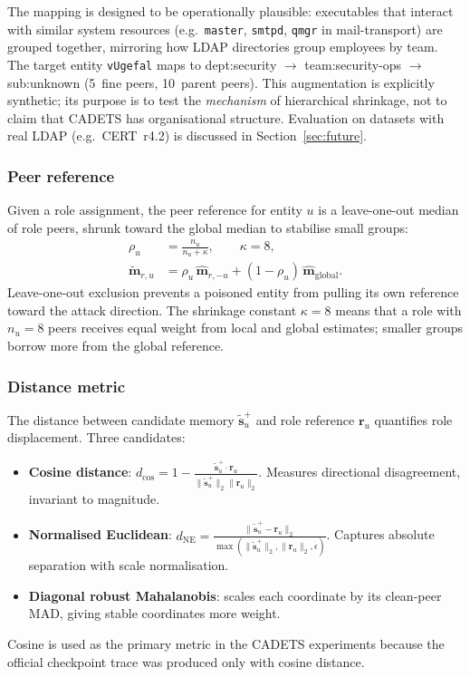 \documentclass[10pt,twocolumn]{article}
\begin{document}
The mapping is designed to be operationally plausible: executables that
interact with similar system resources (e.g.\ \texttt{master},
\texttt{smtpd}, \texttt{qmgr} in mail-transport) are grouped together,
mirroring how LDAP directories group employees by team.  The target
entity \texttt{vUgefal} maps to dept:security $\to$ team:security-ops
$\to$ sub:unknown (5~fine peers, 10~parent peers).  This augmentation is
explicitly synthetic; its purpose is to test the \emph{mechanism} of
hierarchical shrinkage, not to claim that CADETS has organisational
structure.  Evaluation on datasets with real LDAP (e.g.\ CERT~r4.2)
is discussed in Section~\ref{sec:future}.

\subsubsection{Peer reference}

Given a role assignment, the peer reference for entity $u$ is a leave-one-out
median of role peers, shrunk toward the global median to stabilise small
groups:
\begin{align}
  \rho_u &= \frac{n_u}{n_u+\kappa}, \qquad \kappa=8, \label{eq:rho}\\
  \widetilde{\mathbf{m}}_{r,u} &= \rho_u\,\widehat{\mathbf{m}}_{r,-u}
    + (1-\rho_u)\,\widehat{\mathbf{m}}_{\mathrm{global}}.
  \label{eq:shrinkage}
\end{align}
Leave-one-out exclusion prevents a poisoned entity from pulling its own
reference toward the attack direction.  The shrinkage constant $\kappa=8$
means that a role with $n_u=8$ peers receives equal weight from local and
global estimates; smaller groups borrow more from the global reference.

\subsubsection{Distance metric}

The distance between candidate memory $\widetilde{\mathbf{s}}_u^+$ and role
reference $\mathbf{r}_u$ quantifies role displacement.  Three candidates:
\begin{itemize}
  \item \textbf{Cosine distance}: $d_{\cos}=1-\frac{\widetilde{\mathbf{s}}_u^+
    \cdot\mathbf{r}_u}{\|\widetilde{\mathbf{s}}_u^+\|_2
    \|\mathbf{r}_u\|_2}$.
    Measures directional disagreement, invariant to magnitude.
  \item \textbf{Normalised Euclidean}: $d_{\mathrm{NE}}=
    \frac{\|\widetilde{\mathbf{s}}_u^+-\mathbf{r}_u\|_2}
    {\max(\|\widetilde{\mathbf{s}}_u^+\|_2,\|\mathbf{r}_u\|_2,\epsilon)}$.
    Captures absolute separation with scale normalisation.
  \item \textbf{Diagonal robust Mahalanobis}: scales each coordinate by its
    clean-peer MAD, giving stable coordinates more weight.
\end{itemize}
Cosine is used as the primary metric in the CADETS experiments because the
official checkpoint trace was produced only with cosine distance.
\end{document}
